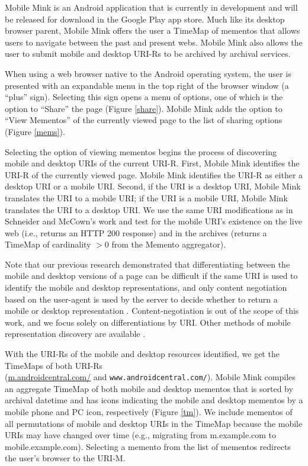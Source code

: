 \documentclass{sig-alternate}
\begin{document}
Mobile Mink is an Android application that is currently in development and will be released for download in the Google Play app store.
Much like its desktop browser parent, Mobile Mink offers the user a TimeMap of mementos that allows users to navigate between the past and present webs. Mobile Mink also allows the user to submit mobile and desktop URI-Rs to be archived by archival services.

When using a web browser native to the Android operating system, the user is presented with an expandable menu in the top right of the browser window (a ``plus'' sign). Selecting this sign opens a menu of options, one of which is the option to ``Share'' the page (Figure \ref{share}). Mobile Mink adds the option to ``View Mementos'' of the currently viewed page to the list of sharing options (Figure \ref{mems}).

Selecting the option of viewing mementos begins the process of discovering mobile and desktop URIs of the current URI-R. First, Mobile Mink identifies the URI-R of the currently viewed page. Mobile Mink identifies the URI-R as either a desktop URI or a mobile URI. Second, if the URI is a desktop URI, Mobile Mink translates the URI to a mobile URI; if the URI is a mobile URI, Mobile Mink translates the URI to a desktop URI. We use the same URI modifications as in Schneider and McCown's work \cite{frankMobile} and test for the mobile URI's existence on the live web (i.e., returns an HTTP 200 response) and in the archives (returns a TimeMap of cardinality $> 0$ from the Memento aggregator).

Note that our previous research demonstrated that differentiating between the mobile and desktop versions of a page can be difficult if the same URI is used to identify the mobile and desktop representations, and only content negotiation based on the user-agent is used by the server to decide whether to return a mobile or desktop representation \cite{idReps}. Content-negotiation is out of the scope of this work, and we focus solely on differentiations by URI. Other methods of mobile representation discovery are available \cite{frankMobileDlib}.

With the URI-Rs of the mobile and desktop resources identified, we get the TimeMaps of both URI-Rs\\ (\url{m.androidcentral.com/} and \texttt{www.androidcentral.com/}). Mobile Mink compiles an aggregate TimeMap of both mobile and desktop mementos that is sorted by archival datetime and has icons indicating the mobile and desktop mementos by a mobile phone and PC icon, respectively (Figure \ref{tm}). We include mementos of all permutations of mobile and desktop URIs in the TimeMap because the mobile URIs may have changed over time (e.g., migrating from m.example.com to mobile.example.com). Selecting a memento from the list of mementos redirects the user's browser to the URI-M.
\end{document}
